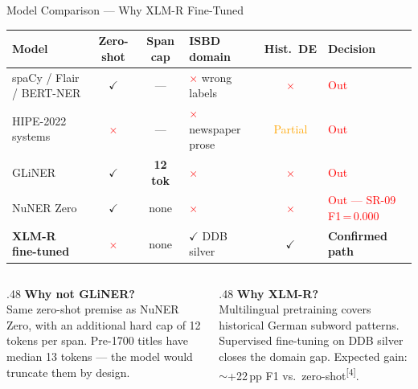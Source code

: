 \documentclass[xcolor,aspectratio=169,compress]{beamer}
\begin{document}
\begin{frame}{Model Comparison --- Why XLM-R Fine-Tuned}
  \footnotesize
  \begin{tabular}{lccp{2cm}cp{2.8cm}}
    \toprule
    Model & Zero-shot & Span cap & ISBD domain & Hist.\ DE & Decision \\
    \midrule
    spaCy / Flair / BERT-NER
      & \textcolor{green!60!black}{$\checkmark$}
      & ---
      & \textcolor{red}{$\times$} wrong labels
      & \textcolor{red}{$\times$}
      & \textcolor{red}{Out} \\[2pt]
    HIPE-2022 systems
      & \textcolor{red}{$\times$}
      & ---
      & \textcolor{red}{$\times$} newspaper prose
      & \textcolor{orange}{Partial}
      & \textcolor{red}{Out} \\[2pt]
    GLiNER
      & \textcolor{green!60!black}{$\checkmark$}
      & \textbf{12 tok}
      & \textcolor{red}{$\times$}
      & \textcolor{red}{$\times$}
      & \textcolor{red}{Out} \\[2pt]
    NuNER Zero
      & \textcolor{green!60!black}{$\checkmark$}
      & none
      & \textcolor{red}{$\times$}
      & \textcolor{red}{$\times$}
      & \textcolor{red}{Out — SR-09 F1\,=\,0.000} \\[2pt]
    \textbf{XLM-R fine-tuned}
      & \textcolor{red}{$\times$}
      & none
      & \textcolor{green!60!black}{$\checkmark$} DDB silver
      & \textcolor{green!60!black}{$\checkmark$}
      & \textcolor{green!60!black}{\textbf{Confirmed path}} \\
    \bottomrule
  \end{tabular}
  \smallskip

  \begin{columns}[t]
    \begin{column}{.48\textwidth}
      \textbf{Why not GLiNER?} \\
      Same zero-shot premise as NuNER Zero, with an additional hard cap of 12 tokens per span.
      Pre-1700 titles have median 13 tokens --- the model would truncate them by design.
    \end{column}
    \begin{column}{.48\textwidth}
      \textbf{Why XLM-R?} \\
      Multilingual pretraining covers historical German subword patterns.
      Supervised fine-tuning on DDB silver closes the domain gap.
      Expected gain: $\sim$+22\,pp F1 vs.\ zero-shot\textsuperscript{[4]}.
    \end{column}
  \end{columns}
\end{frame}
\end{document}
